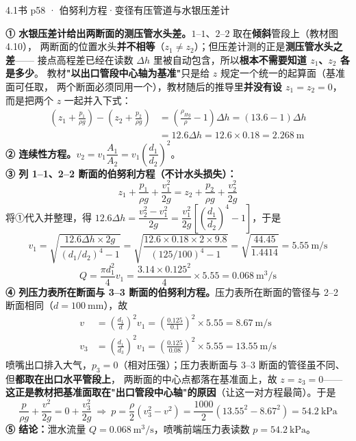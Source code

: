 \begin{liti}{4.1}{书 p58 · 伯努利方程·变径有压管道与水银压差计}
\begin{jie}
\textbf{① 水银压差计给出两断面的测压管水头差。}$1$--$1$、$2$--$2$ 取在\textbf{倾斜}管段上（教材图 4.10），
两断面的位置水头\textbf{并不相等}（$z_1\neq z_2$）；但压差计测的正是\textbf{测压管水头之差}——
接点高程差已经在读数 $\Delta h$ 里被自动包含，所以\textbf{根本不需要知道 $z_1$、$z_2$ 各是多少}。
教材\textbf{"以出口管段中心轴为基准"}只是给 $z$ 规定一个统一的起算面（基准面可任取，
两个断面必须同用一个），教材随后的推导里\textbf{并没有设 $z_1=z_2=0$}，而是把两个 $z$ 一起并入下式：
\[
\begin{aligned}
\left(z_1+\frac{p_1}{\rho g}\right)-\left(z_2+\frac{p_2}{\rho g}\right)&=\left(\frac{\rho_{Hg}}{\rho}-1\right)\Delta h=(13.6-1)\Delta h\\
&=12.6\Delta h=12.6\times0.18=2.268\ \mathrm{m}
\end{aligned}
\]
\textbf{② 连续性方程。}$v_2=v_1\dfrac{A_1}{A_2}=v_1\left(\dfrac{d_1}{d_2}\right)^2$。\\
\textbf{③ 列 1--1、2--2 断面的伯努利方程（不计水头损失）：}
\[ z_1+\frac{p_1}{\rho g}+\frac{v_1^2}{2g}=z_2+\frac{p_2}{\rho g}+\frac{v_2^2}{2g} \]
将①代入并整理，得 $12.6\Delta h=\dfrac{v_2^2-v_1^2}{2g}=\dfrac{v_1^2}{2g}\left[\left(\dfrac{d_1}{d_2}\right)^4-1\right]$，于是
\[ v_1=\sqrt{\frac{12.6\Delta h\times2g}{\left(d_1/d_2\right)^4-1}}
      =\sqrt{\frac{12.6\times0.18\times2\times9.8}{\left(125/100\right)^4-1}}
      =\sqrt{\frac{44.45}{1.4414}}=5.55\ \mathrm{m/s} \]
\[ Q=\frac{\pi d_1^2}{4}v_1=\frac{3.14\times0.125^2}{4}\times5.55=0.068\ \mathrm{m^3/s} \]
\textbf{④ 列压力表所在断面与 3--3 断面的伯努利方程。}压力表所在断面的管径与 2--2 断面相同（$d=100\ \mathrm{mm}$），故
\[
\begin{aligned}
v&=\left(\frac{d_1}{d}\right)^2v_1=\left(\frac{0.125}{0.1}\right)^2\times5.55=8.67\ \mathrm{m/s}\\
v_3&=\left(\frac{d_1}{d_3}\right)^2v_1=\left(\frac{0.125}{0.08}\right)^2\times5.55=13.55\ \mathrm{m/s}
\end{aligned}
\]
喷嘴出口排入大气，$p_3=0$（相对压强）；压力表断面与 $3$--$3$ 断面的管径虽不同、但\textbf{都取在出口水平管段上}，
两断面的中心点都落在基准面上，故 $z=z_3=0$——\textbf{这正是教材把基准面取在"出口管段中心轴"的原因}（让这一对方程最简）。于是
\[ \frac{p}{\rho g}+\frac{v^2}{2g}=0+\frac{v_3^2}{2g}\ \Longrightarrow\
   p=\frac{\rho}{2}\left(v_3^2-v^2\right)=\frac{1000}{2}\left(13.55^2-8.67^2\right)=54.2\ \mathrm{kPa} \]
\textbf{⑤ 结论：}泄水流量 $Q=0.068\ \mathrm{m^3/s}$，喷嘴前端压力表读数 $p=54.2\ \mathrm{kPa}$。
\end{jie}
\end{liti}

